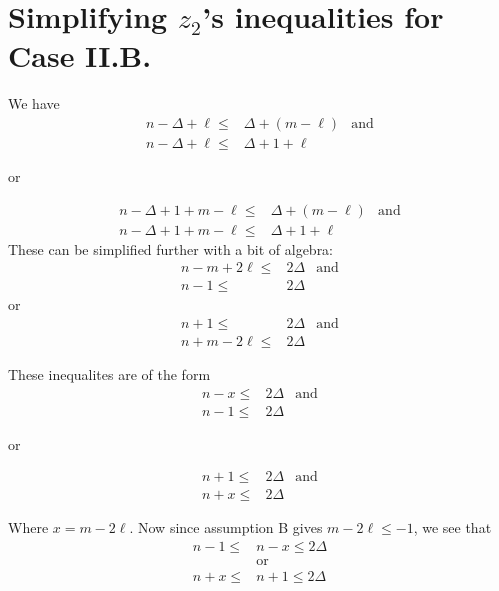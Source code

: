 \newpage
\section{Simplifying $z_2$'s inequalities for Case II.B.}

We have
\begin{align*}
 n - \Delta + \ell \leq & \Delta + (m - \ell) & \text{and} \\
 n - \Delta + \ell \leq & \Delta + 1 + \ell
\end{align*}
\begin{center}or\end{center}
\begin{align*}
 n - \Delta + 1 + m - \ell \leq & \Delta + (m - \ell) & \text{and} \\
 n - \Delta + 1 + m - \ell \leq & \Delta + 1 + \ell
\end{align*}
These can be simplified further with a bit of algebra:
\begin{align*}
 n-m+2\ell \leq & 2 \Delta & \text{and} \\
 n-1 \leq       & 2\Delta
\end{align*}
or
\begin{align*}
 n+1 \leq        & 2 \Delta & \text{and} \\
 n+m-2\ell  \leq & 2 \Delta
\end{align*}

These inequalites are of the form
\begin{align*}
 n-x \leq & 2 \Delta & \text{and} \\
 n-1 \leq & 2\Delta
\end{align*}
\begin{center}or\end{center}
\begin{align*}
 n + 1 \leq & 2 \Delta & \text{and} \\
 n + x \leq & 2 \Delta
\end{align*}

Where $x = m -2\ell$. Now since assumption B gives $m - 2\ell \leq -1$, we
see that
\begin{align*}
 n-1 \leq & n-x \leq 2 \Delta \\
          & \text{or}         \\
 n+x \leq & n+1 \leq 2 \Delta
\end{align*}
